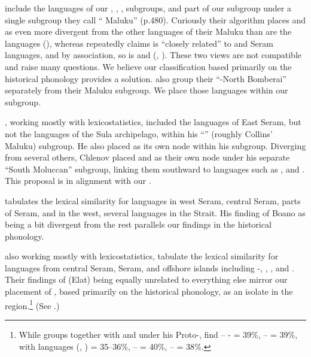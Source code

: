 \citet{GrayGreenhill2009} include the languages of our ,
, ,  subgroups, and
part of our  subgroup under a single
subgroup they call “ Maluku” (p.480).
Curiously their algorithm places 
and  as even more divergent from the other languages of
their  Maluku than are the  languages (),
whereas \citet{Collins1981,Collins1983} repeatedly claims  is “closely
related” to  and Seram languages, and by association,
so is  and 
(\citeyear[15, 19--20]{Collins1983}, \citeyear[86, footnote 1]{Collins1989}).
These two views are not compatible
and raise many questions.
We believe our classification based primarily on the historical
phonology provides a solution. \citet{GrayGreenhill2009}
also group their “-North Bomberai” separately from
their  Maluku subgroup.
We place those languages within our  subgroup.

\citet{Chlenov1976}, working mostly with lexicostatistics,
included the languages of East Seram,
but not the languages of the Sula archipelago,
within his “” (roughly Collins’  Maluku) subgroup.
He also placed  as its own node within his  subgroup.
Diverging from several others,
Chlenov placed  and  as their own node under his
separate “South Moluccan” subgroup,
linking them southward to languages such as ,  and .
This proposal is in alignment with our .

\citet{Taguchi1989} tabulates the lexical similarity for languages
in west Seram, central Seram, parts of  Seram,
and in the west,
several languages in the  Strait.
His finding of Boano as being a bit divergent from the rest parallels
our findings in the historical phonology.

\citet{LoskiLoski1989} also working mostly with lexicostatistics,
tabulate the lexical similarity for languages from central Seram,
 Seram, and offshore islands including -,
, , and .
Their findings \citeyear[112]{LoskiLoski1989} of  (Elat) being equally
unrelated to everything else mirror our placement of ,
based primarily on the historical phonology,
as an isolate in the region.\footnote{\label{fn:BandaLexicalSimilarity}
		While \citet{Collins1986}
		groups  together with 
		and  under his Proto-,
		\citet[112]{LoskiLoski1989} find  -- - =
		39{\%},  --  = 39{\%},
		 with  languages (,
		) = 35--36{\%},  --  = 40{\%},
		 --  = 38{\%}.}
(See .)

